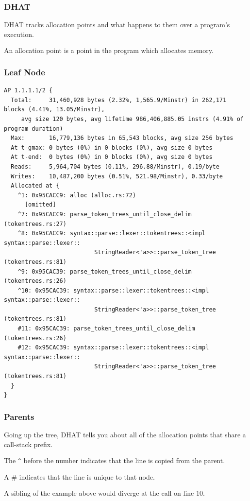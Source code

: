 \begin{frame}
\frametitle{DHAT}
DHAT tracks allocation points and what happens to them over a program's execution. 

An allocation point is a point in the program which allocates memory.

\end{frame}


\begin{frame}[fragile]
\frametitle{Leaf Node}

{\scriptsize
\begin{verbatim}
AP 1.1.1.1/2 {
  Total:     31,460,928 bytes (2.32%, 1,565.9/Minstr) in 262,171 blocks (4.41%, 13.05/Minstr), 
     avg size 120 bytes, avg lifetime 986,406,885.05 instrs (4.91% of program duration)
  Max:       16,779,136 bytes in 65,543 blocks, avg size 256 bytes
  At t-gmax: 0 bytes (0%) in 0 blocks (0%), avg size 0 bytes
  At t-end:  0 bytes (0%) in 0 blocks (0%), avg size 0 bytes
  Reads:     5,964,704 bytes (0.11%, 296.88/Minstr), 0.19/byte
  Writes:    10,487,200 bytes (0.51%, 521.98/Minstr), 0.33/byte
  Allocated at {
    ^1: 0x95CACC9: alloc (alloc.rs:72)
      [omitted]
    ^7: 0x95CACC9: parse_token_trees_until_close_delim (tokentrees.rs:27)
    ^8: 0x95CACC9: syntax::parse::lexer::tokentrees::<impl syntax::parse::lexer::
                          StringReader<'a>>::parse_token_tree (tokentrees.rs:81)
    ^9: 0x95CAC39: parse_token_trees_until_close_delim (tokentrees.rs:26)
    ^10: 0x95CAC39: syntax::parse::lexer::tokentrees::<impl syntax::parse::lexer::
                          StringReader<'a>>::parse_token_tree (tokentrees.rs:81)
    #11: 0x95CAC39: parse_token_trees_until_close_delim (tokentrees.rs:26)
    #12: 0x95CAC39: syntax::parse::lexer::tokentrees::<impl syntax::parse::lexer::
                          StringReader<'a>>::parse_token_tree (tokentrees.rs:81)
  }
}
\end{verbatim}
}


\end{frame}


\begin{frame}
\frametitle{Parents}
 Going up the tree, DHAT tells you about all of the allocation points that share a call-stack
prefix. 

The \texttt{\^} before the number indicates that the line is copied from the parent.

A \# indicates that the line is unique to that node.

A sibling of the example above would diverge at the call on line 10.

\end{frame}



